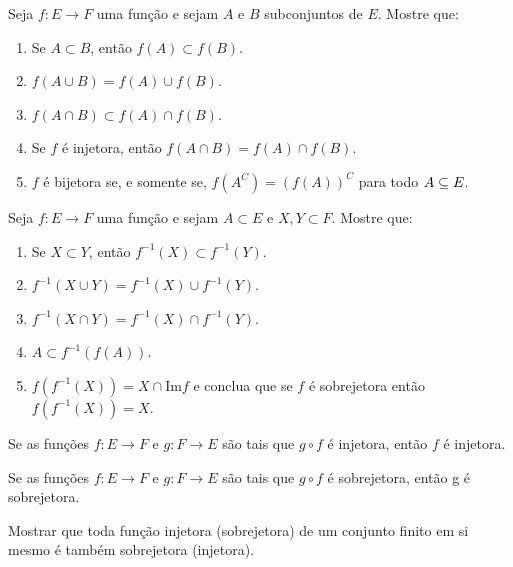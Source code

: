 \documentclass[12pt]{article}
\begin{document}
\vesp

\questao Seja $f:E\to F$ uma fun{\c c}{\~a}o e sejam $A$ e $B$ subconjuntos de $E$. Mostre que:
\begin{enumerate}[label={\alph*})]
\item Se $A\subset B$, ent{\~a}o $f(A)\subset f(B)$.
\item $f(A\cup B)=f(A)\cup f(B)$.
\item $f(A\cap B)\subset f(A)\cap f(B)$.
\item Se $f$ {\'e} injetora, ent{\~a}o $f(A\cap B) =  f(A)\cap f(B)$.
\item $f$ {\'e} bijetora se, e somente se, $f(A^C) = (f(A))^C$ para todo $A \subseteq E$.
\end{enumerate}

\vesp

\questao Seja $f:E\to F$ uma fun{\c c}{\~a}o e sejam $A\subset
E$ e $X, Y\subset F$. Mostre que:
\begin{enumerate}[label={\alph*})]
\item Se $X\subset Y$, ent{\~a}o $f^{-1}(X)\subset f^{-1}(Y)$.
\item $f^{-1}(X\cup Y)=f^{-1}(X)\cup f^{-1}(Y)$.
\item $f^{-1}(X\cap Y)= f^{-1}(X)\cap f^{-1}(Y)$.
\item $A\subset f^{-1}(f(A))$.
\item $f(f^{-1}(X))= X \cap \mbox{Im}f$ e conclua que se $f$ {\'e} sobrejetora ent{\~a}o
$f(f^{-1}(X))=X$.
\end{enumerate}

\vesp

\questao Se as fun{\c c}{\~o}es $f:E\to F$ e $g: F\to E$ s{\~a}o
tais que $g\circ f$ {\'e} injetora, ent{\~a}o $f$ {\'e} injetora.

\vesp

\questao Se as fun{\c c}{\~o}es $f:E\to F$ e $g: F\to E$ s{\~a}o
tais que $g\circ f$ {\'e} sobrejetora, ent{\~a}o g {\'e} sobrejetora.

\vesp

\questao Mostrar que toda fun{\c c}{\~a}o injetora (sobrejetora) de um conjunto finito em si mesmo {\'e} tamb{\'e}m sobrejetora (injetora).
\end{document}

